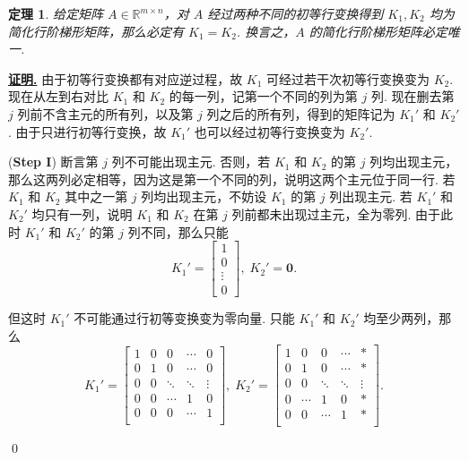\documentclass[10pt,openany]{article}
\theoremstyle{thmstyle} %
\newtheorem{theorem}{定理}[subsection]
\theoremstyle{defstyle} %
\theoremstyle{prostyle} %
\theoremstyle{exastyle}
\theoremstyle{remstyle}
\renewenvironment{proof}[1][证明]{\par\underline{\textbf{#1.}} \;\fangsong}{\qed\par}
\begin{document}
\begin{theorem}	\label{1.1.9}
	给定矩阵 \( A \in \mathbb{R}^{m \times n} \)，对 \( A \) 经过两种不同的初等行变换得到 \( K_1, K_2 \) 均为简化行阶梯形矩阵，那么必定有 \( K_1=K_2 \). 换言之，\( A \) 的简化行阶梯形矩阵必定唯一. 

\end{theorem}

\begin{proof}
	由于初等行变换都有对应逆过程，故 \( K_1 \) 可经过若干次初等行变换变为 \( K_2 \). 现在从左到右对比 \( K_1 \) 和 \( K_2 \) 的每一列，记第一个不同的列为第 \( j \) 列. 现在删去第 \( j \) 列前不含主元的所有列，以及第 \( j \) 列之后的所有列，得到的矩阵记为 \( K_1' \) 和 \( K_2' \). 由于只进行初等行变换，故 \( K_1' \) 也可以经过初等行变换变为 \( K_2' \).
	
	(\textbf{Step I}) 断言第 \( j \) 列不可能出现主元. 否则，若 \( K_1 \) 和 \( K_2 \) 的第 \( j \) 列均出现主元，那么这两列必定相等，因为这是第一个不同的列，说明这两个主元位于同一行. 若 \( K_1 \) 和 \( K_2 \) 其中之一第 \( j \) 列均出现主元，不妨设 \( K_1 \) 的第 \( j \) 列出现主元. 若 \( K_1' \) 和 \( K_2' \) 均只有一列，说明 \( K_1 \) 和 \( K_2 \) 在第 \( j \) 列前都未出现过主元，全为零列. 由于此时 \( K_1' \) 和 \( K_2' \) 的第 \( j \) 列不同，那么只能
	\[ K_1'= \begin{bmatrix}
		1 \\ 0 \\ \vdots \\ 0
	\end{bmatrix}, \; K_2'= \bm{0}. \]
	
	但这时 \( K_1' \) 不可能通过行初等变换变为零向量. 只能 \( K_1' \) 和 \( K_2' \) 均至少两列，那么
	\[ K_1'= \begin{bmatrix}
		1 & 0 & 0  & \cdots & 0 \\
		0 & 1 & 0 & \cdots & 0 \\
		0 & 0 & \ddots & \ddots & \vdots \\
		0 & 0 & \cdots & 1 & 0 \\
		0 & 0 & 0 & \cdots & 1 \\
		 &  &  &  & 
	\end{bmatrix}, \; K_2'=\begin{bmatrix}
	1 & 0 & 0  & \cdots & * \\
	0 & 1 & 0   & \cdots & * \\
	0 & 0 & \ddots & \ddots & \vdots \\
	0 &  \cdots & 1  & 0 & * \\
	0 & 0  & \cdots & 1 & * \\
	 &  &  &  &   
	\end{bmatrix}.  \]
	

\end{proof}
\end{document}
